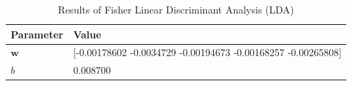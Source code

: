 \begin{table}[H]
\centering
\caption{Results of Fisher Linear Discriminant Analysis (LDA)}
\begin{tabular}{ll}
\toprule
Parameter & Value \\
\midrule
$\mathbf{w}$ & [-0.00178602 -0.0034729  -0.00194673 -0.00168257 -0.00265808] \\
$b$ & 0.008700 \\
\bottomrule
\end{tabular}
\end{table}
